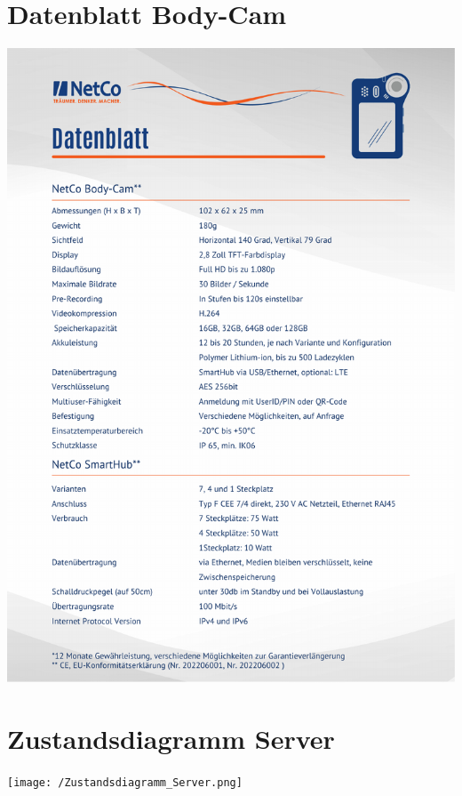 \documentclass[thesis.tex]{subfiles}
\begin{document}
\section{Datenblatt Body-Cam}\label{anhang:datenblatt}

\includegraphics[page=1,width=\textwidth,height=.9\textheight,keepaspectratio]{../sources/Datenblatt_Bodycam.pdf}

\section{Zustandsdiagramm Server}\label{anhang:zustandsdiagram_server}

\texttt{[image: /Zustandsdiagramm\_Server.png]}
\end{document}
